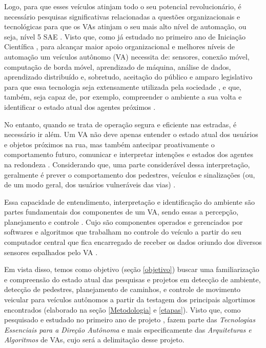 \documentclass{article}
\begin{document}
Logo, para que esses veículos atinjam todo o seu potencial revolucionário, é necessário pesquisas significativas relacionadas a questões organizacionais e tecnológicas para que os VAs atinjam o seu mais alto nível de automação, ou seja, nível 5 SAE \cite{SAE}. Visto que, como já estudado no primeiro ano de Iniciação Científica \cite{my-work-on-git}, para alcançar maior apoio organizacional e melhores níveis de automação um veículos autônomo (VA) necessita de: sensores, conexão móvel, computação de borda móvel, aprendizado de máquina, análise de dados, aprendizado distribuído e, sobretudo, aceitação do público e amparo legislativo para que essa tecnologia seja extensamente utilizada pela sociedade \cite{KPMG}, e que, também, seja capaz de, por exemplo, compreender o ambiente a sua volta e identificar o estado atual dos agentes próximos \cite{sensors-yet}.

No entanto, quando se trata de operação segura e eficiente nas estradas, é necessário ir além. Um VA não deve apenas entender o estado atual dos usuários e objetos próximos na rua, mas também antecipar proativamente o comportamento futuro, comunicar e interpretar intenções e estados dos agentes na redondeza \cite{conge}. Considerando que, uma parte considerável dessa interpretação, geralmente é prever o comportamento dos pedestres, veículos e sinalizações (ou, de um modo geral, dos usuários vulneráveis das vias) \cite{software-review}.

Essa capacidade de entendimento, interpretação  e identificação do ambiente são partes fundamentais dos componentes de um VA, sendo essas a percepção, planejamento e controle  \cite[p. ~37]{my-work-on-git}. Cujo são componentes operados e gerenciados por softwares e algoritmos que trabalham no controle do veículo a partir do seu computador central que fica encarregado de receber os dados oriundo dos diversos sensores espalhados pelo VA \cite[p. ~39]{my-work-on-git}.

    
    Em vista disso, temos como objetivo (seção \ref{objetivo}) buscar uma familiarização e compreensão do estado atual das pesquisas e projetos em detecção de ambiente, detecção de pedestres, planejamento de caminhos, e controle de movimento veicular para veículos autônomos a partir da testagem dos principais algortimos encontrados (elaborado na seção \ref{Metodologia} e \ref{etapas}). Visto que, como pesquisado e estudado no primeiro ano de projeto \cite{my-work-on-git}, fazem parte das \textit{Tecnologias Essenciais para a Direção Autônoma} e mais especificamente das \textit{Arquiteturas e Algoritmos} de VAs, cujo será a delimitação desse projeto.
 
\end{document}
